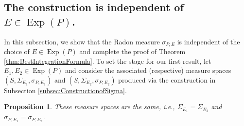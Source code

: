 \documentclass[11pt]{article}
\newtheorem{proposition}[theorem]{Proposition}
\newcommand\Exp{\operatorname{Exp}}
\begin{document}
\subsection{The construction is independent of $E\in\Exp(P)$.}\label{subsec:IndependentofE}

\noindent In this subsection, we show that the Radon measure $\sigma_{P,E}$ is independent of the choice of $E\in\Exp(P)$ and complete the proof of Theorem \ref{thm:BestIntegrationFormula}. To set the stage for our first result, let $E_1,E_2\in\Exp(P)$ and consider the associated (respective) measure spaces $(S,\Sigma_{E_1},\sigma_{P,E_1})$ and $(S,\Sigma_{E_2},\sigma_{P,E_2})$ produced via the construction in Subsection \ref{subsec:ConstructionofSigma}. 

\begin{proposition}\label{prop:Endependence}
These measure spaces are the same, i.e., $\Sigma_{E_1}=\Sigma_{E_2}$ and $\sigma_{P,E_1}=\sigma_{P,E_2}$.
\end{proposition}
\end{document}
